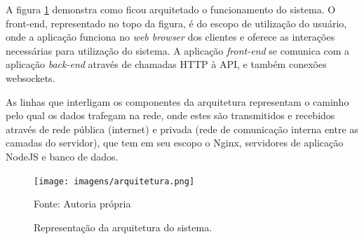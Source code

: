 A figura \ref{fig:architecture} demonstra como ficou arquitetado o funcionamento do sistema. O front-end, representado no topo da figura, é do escopo de utilização do usuário, onde a aplicação funciona no \textit{web browser} dos clientes e oferece as interações necessárias para utilização do sistema. A aplicação \textit{front-end} se comunica com a aplicação \textit{back-end} através de chamadas HTTP à API, e também conexões websockets.

As linhas que interligam os componentes da arquitetura representam o caminho pelo qual os dados trafegam na rede, onde estes são transmitidos e recebidos através de rede pública (internet) e privada (rede de comunicação interna entre as camadas do servidor), que tem em seu escopo o Nginx, servidores de aplicação NodeJS e banco de dados.

\begin{figure}[!htb]
	\centering
	\texttt{[image: imagens/arquitetura.png]}
	\caption{\small Representação da arquitetura do sistema.} Fonte: Autoria própria
	\label{fig:architecture}
\end{figure}
